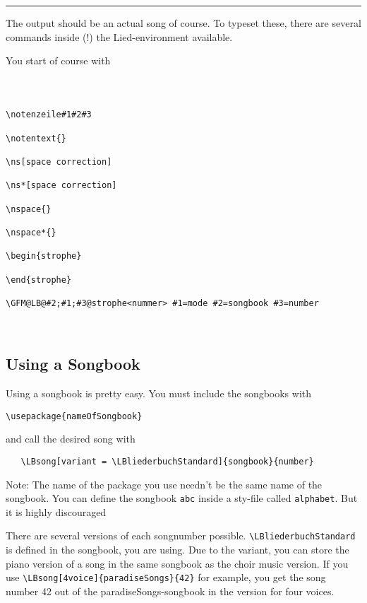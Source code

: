 \documentclass[12pt,a4paper]{scrreprt}
\begin{document}
\noindent\rule{\textwidth}{1pt}

The output should be an actual song of course. To typeset these, there are several commands inside (!) the Lied-environment available.

You start of course with 
\begin{verbatim}

\end{verbatim}

\begin{verbatim}

\end{verbatim}

\begin{verbatim}

\notenzeile#1#2#3

\notentext{}

\ns[space correction]

\ns*[space correction]

\nspace{}

\nspace*{}

\begin{strophe}

\end{strophe}

\GFM@LB@#2;#1;#3@strophe<nummer> #1=mode #2=songbook #3=number



\end{verbatim}

\subsection{Using a Songbook}
Using a songbook is pretty easy. You must include the songbooks with 

\verb+\usepackage{nameOfSongbook}+ 


and call the desired song with
\begin{verbatim}
   \LBsong[variant = \LBliederbuchStandard]{songbook}{number}
\end{verbatim}
Note: The name of the package you use needn't be the same name of the songbook. You can define the songbook \verb+abc+ inside a sty-file called \verb+alphabet+. But it is highly discouraged

There are several versions of each songnumber possible. \verb+\LBliederbuchStandard+ is defined in the songbook, you are using. %
Due to the variant, you can store the piano version of a song in the same songbook as the choir music version.
If you use \verb+\LBsong[4voice]{paradiseSongs}{42}+ for example, you get the song number 42 out of the paradiseSongs-songbook in the version for four voices.
\end{document}
